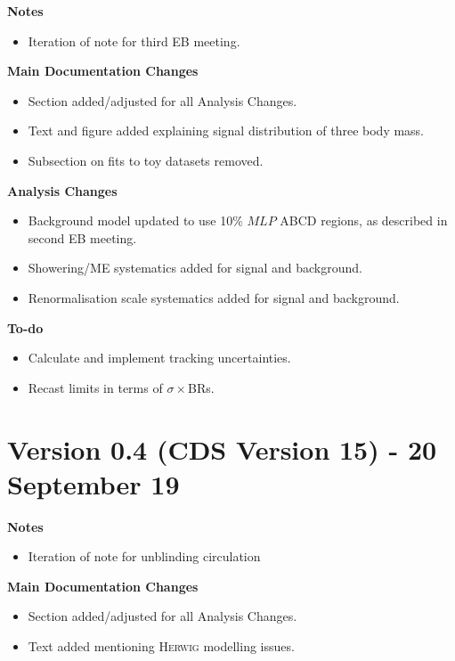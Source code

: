 \documentclass[NOTE, atlasdraft=true, texlive=2017, UKenglish]{\ATLASLATEXPATH atlasdoc}
\begin{document}
\textbf{Notes}
\begin{itemize}
\item Iteration of note for third EB meeting.
\end{itemize}

\textbf{Main Documentation Changes}
\begin{itemize}
\item Section added/adjusted for all Analysis Changes.
\item Text and figure added explaining signal distribution of three body mass.
\item Subsection on fits to toy datasets removed.
\end{itemize}

\textbf{Analysis Changes}
\begin{itemize}
\item Background model updated to use 10\% $MLP$ ABCD regions, as described in second EB meeting.
\item Showering/ME systematics added for signal and background.
\item Renormalisation scale systematics added for signal and background.
\end{itemize}

\textbf{To-do}
\begin{itemize}
\item Calculate and implement tracking uncertainties.
\item Recast limits in terms of $\sigma\times$BRs.
\end{itemize}

\section*{Version 0.4 (CDS Version 15) - 20 September 19}

\textbf{Notes}
\begin{itemize}
\item Iteration of note for unblinding circulation
\end{itemize}

\textbf{Main Documentation Changes}
\begin{itemize}
\item Section added/adjusted for all Analysis Changes.
\item Text added mentioning \textsc{Herwig} modelling issues.
\end{itemize}
\end{document}
